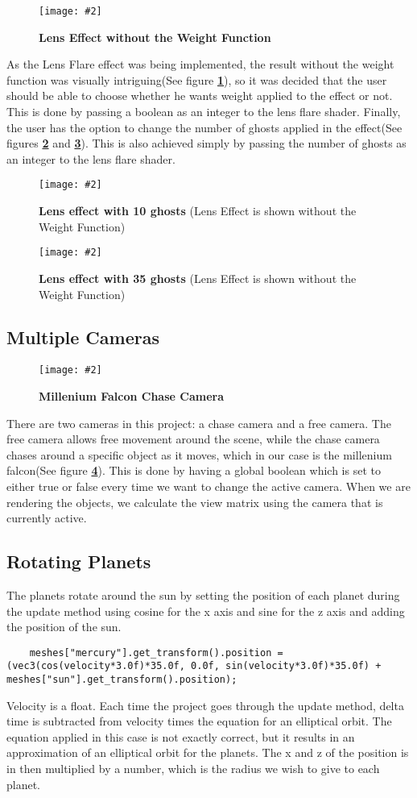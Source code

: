 \documentclass[10pt, a4paper]{article}
\newcommand{\figuremacro}[5]{
    \begin{figure}[#1]
        \centering
        \texttt{[image: \#2]}
        \caption[#3]{\textbf{#3}#4}
        \label{fig:#2}
    \end{figure}
}
\begin{document}
	\figuremacro{H}{WeightlessLens}{Lens Effect without the Weight Function}{ }{1.0}
	
	As the Lens Flare effect was being implemented, the result without the weight function was visually intriguing(See figure \textbf{\ref{fig:WeightlessLens}}), so it was decided that the user should be able to choose whether he wants weight applied to the effect or not. This is done by passing a boolean as an integer to the lens flare shader. Finally, the user has the option to change the number of ghosts applied in the effect(See figures \textbf{\ref{fig:LensShapes1}} and \textbf{\ref{fig:LensShapes2}}). This is also achieved simply by passing the number of ghosts as an integer to the lens flare shader.
	
	\figuremacro{H}{LensShapes1}{Lens effect with 10 ghosts }{(Lens Effect is shown without the Weight Function) }{1.0}
	\figuremacro{H}{LensShapes2}{Lens effect with 35 ghosts }{(Lens Effect is shown without the Weight Function)}{1.0}


	
\subsection{Multiple Cameras}	
	
		\figuremacro{H}{Project_Falcon}{Millenium Falcon Chase Camera}{ }{1.0}
	
	There are two cameras in this project: a chase camera and a free camera. The free camera allows free movement around the scene, while the chase camera chases around a specific object as it moves, which in our case is the millenium falcon(See figure \textbf{\ref{fig:Project_Falcon}}). This is done by having a global boolean which is set to either true or false every time we want to change the active camera. When we are rendering the objects, we calculate the view matrix using the camera that is currently active. 
	
\subsection{Rotating Planets}	

	The planets rotate around the sun by setting the position of each planet during the update method using cosine for the x axis and sine for the z axis and adding the position of the sun.
	\begin{lstlisting}
	meshes["mercury"].get_transform().position = (vec3(cos(velocity*3.0f)*35.0f, 0.0f, sin(velocity*3.0f)*35.0f) + meshes["sun"].get_transform().position); 
	\end{lstlisting}
	 Velocity is a float. Each time the project goes through the update method, delta time is subtracted from velocity times the equation for an elliptical orbit. The equation applied in this case is not exactly correct, but it results in an approximation of an elliptical orbit for the planets. The x and z of the position is in then multiplied by a number, which is the radius we wish to give to each planet.
	 
\end{document}
